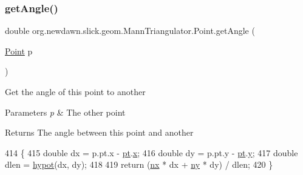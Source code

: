 \subsubsection{\texorpdfstring{get\+Angle()}{getAngle()}}
{\footnotesize\ttfamily double org.\+newdawn.\+slick.\+geom.\+Mann\+Triangulator.\+Point.\+get\+Angle (\begin{DoxyParamCaption}\item[{\mbox{\hyperlink{classorg_1_1newdawn_1_1slick_1_1geom_1_1_mann_triangulator_1_1_point}{Point}}}]{p }\end{DoxyParamCaption})\hspace{0.3cm}{\ttfamily [inline]}}

Get the angle of this point to another


\begin{DoxyParams}{Parameters}
{\em p} & The other point \\
\hline
\end{DoxyParams}
\begin{DoxyReturn}{Returns}
The angle between this point and another 
\end{DoxyReturn}

\begin{DoxyCode}
414                                         \{
415             \textcolor{keywordtype}{double} dx = p.pt.x - \mbox{\hyperlink{classorg_1_1newdawn_1_1slick_1_1geom_1_1_mann_triangulator_1_1_point_afd78802a3fe9d6abf60a218d24be56aa}{pt}}.\mbox{\hyperlink{classorg_1_1newdawn_1_1slick_1_1geom_1_1_vector2f_a3c72cdf13ebc511a472e1a02002fa579}{x}};
416             \textcolor{keywordtype}{double} dy = p.pt.y - \mbox{\hyperlink{classorg_1_1newdawn_1_1slick_1_1geom_1_1_mann_triangulator_1_1_point_afd78802a3fe9d6abf60a218d24be56aa}{pt}}.\mbox{\hyperlink{classorg_1_1newdawn_1_1slick_1_1geom_1_1_vector2f_aa03914f0c3d32063aa90e5bd7b74688e}{y}};
417             \textcolor{keywordtype}{double} dlen = \mbox{\hyperlink{classorg_1_1newdawn_1_1slick_1_1geom_1_1_mann_triangulator_1_1_point_a78efe3aa0584448617fc6132371799cd}{hypot}}(dx, dy);
418 
419             \textcolor{keywordflow}{return} (\mbox{\hyperlink{classorg_1_1newdawn_1_1slick_1_1geom_1_1_mann_triangulator_1_1_point_a24e1b6fd160503d3a3ecebb304e166b3}{nx}} * dx + \mbox{\hyperlink{classorg_1_1newdawn_1_1slick_1_1geom_1_1_mann_triangulator_1_1_point_ae59a8e9d59fe7ba6c457aac1bce71e6d}{ny}} * dy) / dlen;
420         \}
\end{DoxyCode}
\mbox{\label{classorg_1_1newdawn_1_1slick_1_1geom_1_1_mann_triangulator_1_1_point_a78efe3aa0584448617fc6132371799cd}} 
